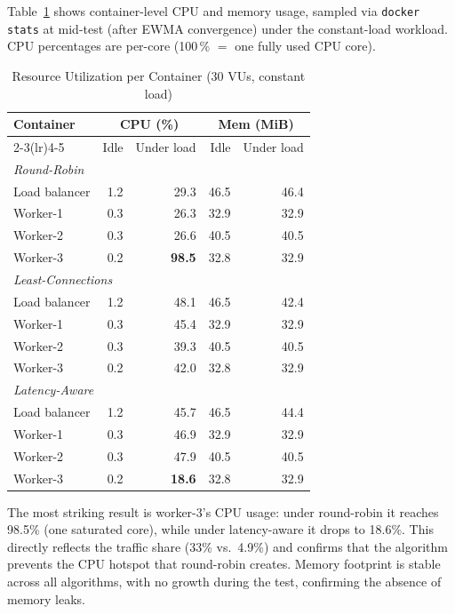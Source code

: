 \documentclass[conference]{IEEEtran}
\begin{document}
Table~\ref{tab:resources} shows container-level CPU and memory usage,
sampled via \texttt{docker stats} at mid-test (after EWMA convergence)
under the constant-load workload. CPU percentages are per-core (100\,\%
$=$ one fully used CPU core).

\begin{table}[h]
\caption{Resource Utilization per Container (30 VUs, constant load)}
\label{tab:resources}
\centering
\small
\begin{tabular}{@{}lrrrr@{}}
\toprule
Container & \multicolumn{2}{c}{CPU (\%)} & \multicolumn{2}{c}{Mem (MiB)} \\
\cmidrule(lr){2-3}\cmidrule(lr){4-5}
 & Idle & Under load & Idle & Under load \\
\midrule
\multicolumn{5}{l}{\textit{Round-Robin}} \\
Load balancer & 1.2 & 29.3 & 46.5 & 46.4 \\
Worker-1      & 0.3 & 26.3 & 32.9 & 32.9 \\
Worker-2      & 0.3 & 26.6 & 40.5 & 40.5 \\
Worker-3      & 0.2 & \textbf{98.5} & 32.8 & 32.9 \\
\midrule
\multicolumn{5}{l}{\textit{Least-Connections}} \\
Load balancer & 1.2 & 48.1 & 46.5 & 42.4 \\
Worker-1      & 0.3 & 45.4 & 32.9 & 32.9 \\
Worker-2      & 0.3 & 39.3 & 40.5 & 40.5 \\
Worker-3      & 0.2 & 42.0 & 32.8 & 32.9 \\
\midrule
\multicolumn{5}{l}{\textit{Latency-Aware}} \\
Load balancer & 1.2 & 45.7 & 46.5 & 44.4 \\
Worker-1      & 0.3 & 46.9 & 32.9 & 32.9 \\
Worker-2      & 0.3 & 47.9 & 40.5 & 40.5 \\
Worker-3      & 0.2 & \textbf{18.6} & 32.8 & 32.9 \\
\bottomrule
\end{tabular}
\end{table}

The most striking result is worker-3's CPU usage: under round-robin it
reaches 98.5\% (one saturated core), while under latency-aware it drops
to 18.6\%. This directly reflects the traffic share (33\% vs.\ 4.9\%)
and confirms that the algorithm prevents the CPU hotspot that round-robin
creates. Memory footprint is stable across all algorithms, with no growth
during the test, confirming the absence of memory leaks.
\end{document}
